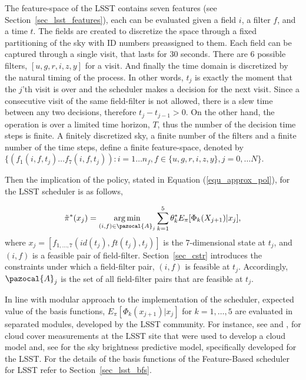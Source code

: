\documentclass[12pt]{aastex62}
\theoremstyle{definition}
\DeclareMathOperator*{\argmin}{arg\,min}
\begin{document}
The feature-space of the LSST contains seven features (see Section~\ref{sec_lsst_features}), each can be evaluated given a field $i$, a filter $f$, and a time $t$. The fields are created to discretize the space through a fixed partitioning of the sky with ID numbers preassigned to them. Each field can be captured through a single visit, that lasts for 30 seconds. There are 6 possible filters, $[u,g,r,i,z,y]$ for a visit. And finally the time domain is discretized by the natural timing of the process. In other words, $t_j$ is exactly the moment that the $j$'th visit is over and the scheduler makes a decision for the next visit. Since a consecutive visit of the same field-filter is not allowed, there is a slew time between any two decisions, therefore $t_{j} - t_{j-1} > 0$. On the other hand, the operation is over a limited time horizon, $T$, thus the number of the decision time steps is finite. A finitely discretized sky, a finite number of the filters and a finite number of the time steps, define a finite feature-space, denoted by $\{(f_1(i,f,t_j)\dots f_7(i,f,t_j)): i = 1\dots n_f, f\in \{u,g,r,i,z,y\}, j = 0,\dots N\}$.

Then the implication of the policy, stated in Equation (\ref{equ_approx_pol}), for the LSST scheduler is as follows,

\begin{equation}\label{equ_approx_pol_imp}
\tilde{\pi}^*(x_j)= \argmin_{(i,f)\in \pazocal{A}_{j}} \sum_{k=1}^5 \theta^*_k E_{\pi}[\Phi_k(X_{j+1}) | x_j]\\,
\end{equation}
where $x_j = [f_{1, \dots,7}(id(t_j),ft(t_j),t_j)]$ is the 7-dimensional state at $t_j$, and $(i,f)$ is a feasible pair of field-filter. Section~\ref{sec_cstr} introduces the constraints under which a field-filter pair, $(i,f)$ is feasible at $t_{j}$. Accordingly, $\pazocal{A}_j$ is  the set of all field-filter pairs that are feasible at $t_j$.

In line with modular approach to the implementation of the scheduler, expected value of the basis functions, $E_{\pi}[\Phi_k(x_{j+1})|x_j]$ for $k=1,\dots, 5$ are evaluated in separated modules, developed by the LSST community. For instance, see \citep{sebag2008lsst} and \citep{sebag2007lsst}, for cloud cover measurements at the LSST site that were used to develop a cloud model and, see \citep{yoachim2016optical} for the sky brightness predictive model, specifically developed for the LSST. For the details of the basis functions of the Feature-Based scheduler for LSST refer to Section~\ref{sec_lsst_bfs}.
\end{document}

